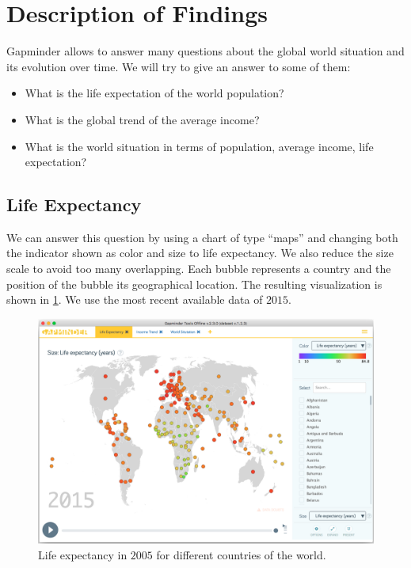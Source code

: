 \section{Description of Findings}
\label{sec:findings}

Gapminder allows to answer many questions about the global world situation and its evolution over time.
We will try to give an answer to some of them:
\begin{itemize}
    \item What is the life expectation of the world population?
    \item What is the global trend of the average income?    
    \item What is the world situation in terms of population, average income, life expectation?
\end{itemize}


\subsection{Life Expectancy}
We can answer this question by using a chart of type ``maps'' and changing both the indicator shown as color and size to life expectancy.
We also reduce the size scale to avoid too many overlapping.
Each bubble represents a country and the position of the bubble its geographical location.
The resulting visualization is shown in \cref{fig:life-expectation}.
We use the most recent available data of $2015$.

\begin{figure}[h]
	\centering
	\includegraphics[width=0.95\columnwidth]{figures/life-expectancy}
	\caption{Life expectancy in $2005$ for different countries of the world.}
	\label{fig:life-expectation}
\end{figure}

